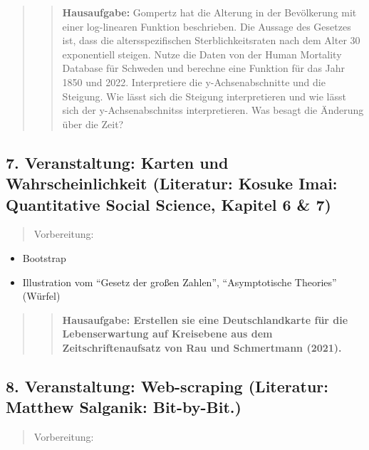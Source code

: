 \begin{quote}
\begin{quote}
\textbf{Hausaufgabe:} Gompertz hat die Alterung in der Bevölkerung mit
einer log-linearen Funktion beschrieben. Die Aussage des Gesetzes ist,
dass die altersspezifischen Sterblichkeitsraten nach dem Alter 30
exponentiell steigen. Nutze die Daten von der Human Mortality Database
für Schweden und berechne eine Funktion für das Jahr 1850 und 2022.
Interpretiere die y-Achsenabschnitte und die Steigung. Wie lässt sich
die Steigung interpretieren und wie lässt sich der y-Achsenabschnitss
interpretieren. Was besagt die Änderung über die Zeit?
\end{quote}
\end{quote}

\subsection{7. Veranstaltung: Karten und Wahrscheinlichkeit (Literatur:
Kosuke Imai: Quantitative Social Science, Kapitel 6 \&
7)}\label{veranstaltung-karten-und-wahrscheinlichkeit-literatur-kosuke-imai-quantitative-social-science-kapitel-6-7}

\begin{quote}
Vorbereitung:
\end{quote}

\begin{itemize}
\tightlist
\item
  Bootstrap
\item
  Illustration vom ``Gesetz der großen Zahlen'', ``Asymptotische
  Theories'' (Würfel)
\end{itemize}

\begin{quote}
\begin{quote}
\textbf{Hausaufgabe: Erstellen sie eine Deutschlandkarte für die
Lebenserwartung auf Kreisebene aus dem Zeitschriftenaufsatz von Rau und
Schmertmann (2021).}
\end{quote}
\end{quote}

\subsection{8. Veranstaltung: Web-scraping (Literatur: Matthew Salganik:
Bit-by-Bit.)}\label{veranstaltung-web-scraping-literatur-matthew-salganik-bit-by-bit.}

\begin{quote}
Vorbereitung:
\end{quote}

